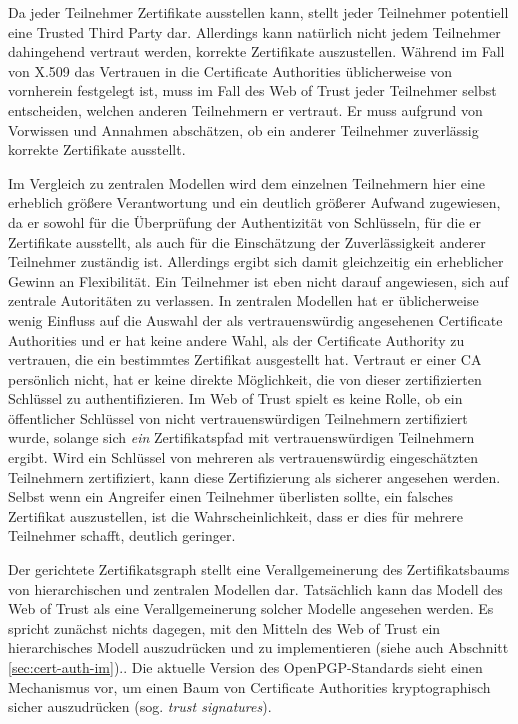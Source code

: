 Da jeder Teilnehmer Zertifikate ausstellen kann, stellt jeder
Teilnehmer potentiell eine Trusted Third Party dar. Allerdings kann
natürlich nicht jedem Teilnehmer dahingehend vertraut werden,
korrekte Zertifikate auszustellen. Während im Fall von X.509 das
Vertrauen in die Certificate Authorities üblicherweise von
vornherein festgelegt ist, muss im Fall des Web of Trust jeder
Teilnehmer selbst entscheiden, welchen anderen Teilnehmern er
vertraut. Er muss aufgrund von Vorwissen und Annahmen abschätzen, ob
ein anderer Teilnehmer zuverlässig korrekte Zertifikate
ausstellt. 

Im Vergleich zu zentralen Modellen wird dem einzelnen Teilnehmern hier
eine erheblich größere Verantwortung und ein deutlich größerer
Aufwand zugewiesen, da er sowohl für die Überprüfung der
Authentizität von Schlüsseln, für die er Zertifikate ausstellt,
als auch für die Einschätzung der Zuverlässigkeit anderer
Teilnehmer zuständig ist. Allerdings ergibt sich damit gleichzeitig
ein erheblicher Gewinn an Flexibilität. Ein Teilnehmer ist eben
nicht darauf angewiesen, sich auf zentrale Autoritäten zu
verlassen. In zentralen Modellen hat er üblicherweise wenig Einfluss
auf die Auswahl der als vertrauenswürdig angesehenen Certificate
Authorities und er hat keine andere Wahl, als der Certificate
Authority zu vertrauen, die ein bestimmtes Zertifikat ausgestellt
hat. Vertraut er einer CA persönlich nicht, hat er keine direkte
Möglichkeit, die von dieser zertifizierten Schlüssel zu
authentifizieren. Im Web of Trust spielt es keine Rolle, ob ein
öffentlicher Schlüssel von nicht vertrauenswürdigen Teilnehmern
zertifiziert wurde, solange sich \emph{ein} Zertifikatspfad mit
vertrauenswürdigen Teilnehmern ergibt. Wird ein Schlüssel von
mehreren als vertrauenswürdig eingeschätzten Teilnehmern
zertifiziert, kann diese Zertifizierung als sicherer angesehen
werden. Selbst wenn ein Angreifer einen Teilnehmer überlisten
sollte, ein falsches Zertifikat auszustellen, ist die
Wahrscheinlichkeit, dass er dies für mehrere Teilnehmer schafft,
deutlich geringer.

Der gerichtete Zertifikatsgraph stellt eine Verallgemeinerung des
Zertifikatsbaums von hierarchischen und zentralen Modellen
dar. Tatsächlich kann das Modell des Web of Trust als eine
Verallgemeinerung solcher Modelle angesehen werden. Es spricht
zunächst nichts dagegen, mit den Mitteln des Web of Trust ein
hierarchisches Modell auszudrücken und zu implementieren (siehe auch
Abschnitt \ref{sec:cert-auth-im}).. Die aktuelle Version des
OpenPGP-Standards sieht einen Mechanismus vor, um einen Baum von
Certificate Authorities kryptographisch sicher auszudrücken
(sog. \emph{trust signatures}).

